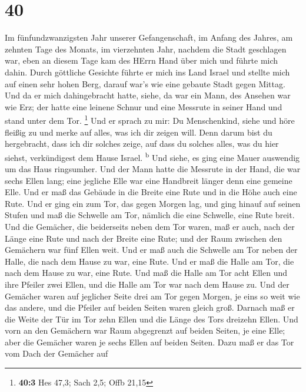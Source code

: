 \hypertarget{section-39}{%
\section{40}\label{section-39}}

 Im fünfundzwanzigsten Jahr unserer Gefangenschaft, im
Anfang des Jahres, am zehnten Tage des Monats, im vierzehnten Jahr,
nachdem die Stadt geschlagen war, eben an diesem Tage kam des HErrn Hand
über mich und führte mich dahin.  Durch göttliche Gesichte
führte er mich ins Land Israel und stellte mich auf einen sehr hohen
Berg, darauf war's wie eine gebaute Stadt gegen Mittag. 
Und da er mich dahingebracht hatte, siehe, da war ein Mann, des Ansehen
war wie Erz; der hatte eine leinene Schnur und eine Messrute in seiner
Hand und stand unter dem Tor. \footnote{\textbf{40:3} Hes 47,3; Sach
  2,5; Offb 21,15}  Und er sprach zu mir: Du Menschenkind,
siehe und höre fleißig zu und merke auf alles, was ich dir zeigen will.
Denn darum bist du hergebracht, dass ich dir solches zeige, auf dass du
solches alles, was du hier siehst, verkündigest dem Hause Israel.
\textsuperscript{b}  Und siehe, es ging eine Mauer
auswendig um das Haus ringsumher. Und der Mann hatte die Messrute in der
Hand, die war sechs Ellen lang; eine jegliche Elle war eine Handbreit
länger denn eine gemeine Elle. Und er maß das Gebäude in die Breite eine
Rute und in die Höhe auch eine Rute.  Und er ging ein zum
Tor, das gegen Morgen lag, und ging hinauf auf seinen Stufen und maß die
Schwelle am Tor, nämlich die eine Schwelle, eine Rute breit.
 Und die Gemächer, die beiderseits neben dem Tor waren,
maß er auch, nach der Länge eine Rute und nach der Breite eine Rute; und
der Raum zwischen den Gemächern war fünf Ellen weit. Und er maß auch die
Schwelle am Tor neben der Halle, die nach dem Hause zu war, eine Rute.
 Und er maß die Halle am Tor, die nach dem Hause zu war,
eine Rute.  Und maß die Halle am Tor acht Ellen und ihre
Pfeiler zwei Ellen, und die Halle am Tor war nach dem Hause zu.
 Und der Gemächer waren auf jeglicher Seite drei am Tor
gegen Morgen, je eins so weit wie das andere, und die Pfeiler auf beiden
Seiten waren gleich groß.  Darnach maß er die Weite der
Tür im Tor zehn Ellen und die Länge des Tors dreizehn Ellen.
 Und vorn an den Gemächern war Raum abgegrenzt auf beiden
Seiten, je eine Elle; aber die Gemächer waren je sechs Ellen auf beiden
Seiten.  Dazu maß er das Tor vom Dach der Gemächer auf
